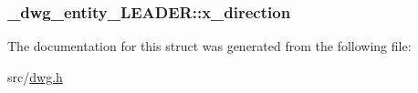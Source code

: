 \hypertarget{struct__dwg__entity__LEADER_a615ba14a21e3e75438c2e05f30ac46a3}{
\subsubsection[{x\-\_\-direction}]{ {\bf \-\_\-dwg\-\_\-entity\-\_\-\-L\-E\-A\-D\-E\-R\-::x\-\_\-direction}}}\label{struct__dwg__entity__LEADER_a615ba14a21e3e75438c2e05f30ac46a3}


\-The documentation for this struct was generated from the following file\-:\begin{DoxyCompactItemize}
\item 
src/\hyperlink{dwg_8h}{dwg.\-h}\end{DoxyCompactItemize}
